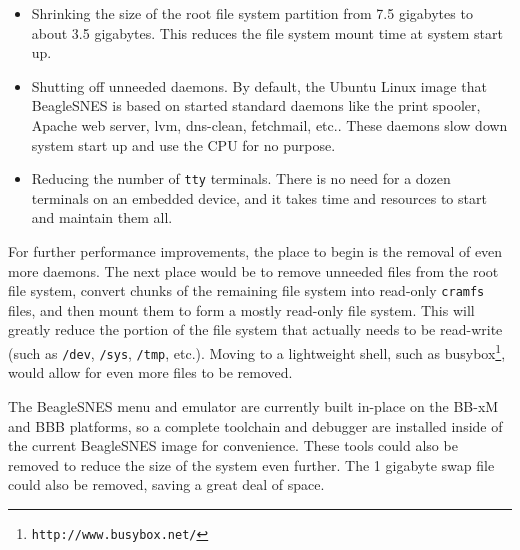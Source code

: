 \begin{itemize}
\item Shrinking the size of the root file system partition from 7.5 gigabytes to about 3.5 gigabytes.  This reduces the file system mount time at system start up.
\item Shutting off unneeded daemons.  By default, the Ubuntu Linux image that BeagleSNES is based on started standard daemons like the print spooler, Apache web server, lvm, dns-clean, fetchmail, etc..  These daemons slow down system start up and use the CPU for no purpose.
\item Reducing the number of \texttt{tty} terminals.  There is no need for a dozen terminals on an embedded device, and it takes time and resources to start and maintain them all.
\end{itemize}

For further performance improvements, the place to begin is the removal of even more daemons.  The next place would be to remove unneeded files from the root file system, convert chunks of the remaining file system into read-only \texttt{cramfs} files, and then mount them to form a mostly read-only file system.  This will greatly reduce the portion of the file system that actually needs to be read-write (such as \texttt{/dev}, \texttt{/sys}, \texttt{/tmp}, etc.).  Moving to a lightweight shell, such as busybox\footnote{\texttt{http://www.busybox.net/}}, would allow for even more files to be removed.  

The BeagleSNES menu and emulator are currently built in-place on the BB-xM and BBB platforms, so a complete toolchain and debugger are installed inside of the current BeagleSNES image for convenience.  These tools could also be removed to reduce the size of the system even further.  The 1 gigabyte swap file could also be removed, saving a great deal of space.